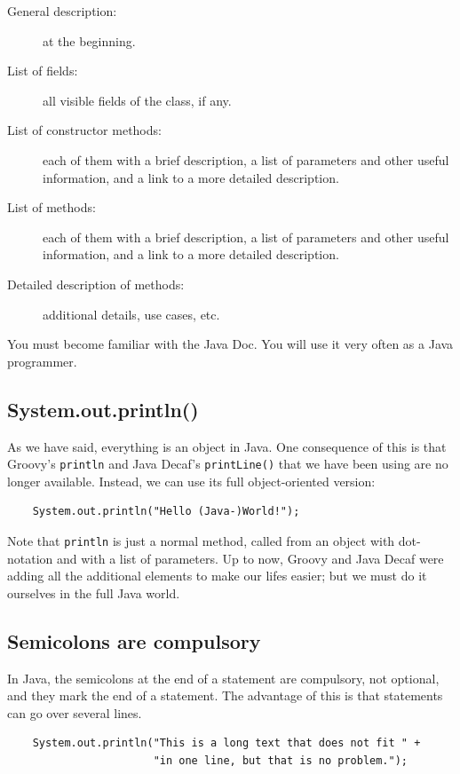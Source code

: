 \begin{description}
\item[General description:] at the beginning.
\item[List of fields:] all visible fields of the class, if any.
\item[List of constructor methods:] each of them with a brief
  description, a list of parameters and other useful information, and
  a link to a more detailed description.
\item[List of methods:] each of them with a brief
  description, a list of parameters and other useful information, and
  a link to a more detailed description.
\item[Detailed description of methods:] additional details, use cases,
  etc. 
\end{description}

You must become familiar with the Java Doc. You will use it very often
as a Java programmer. 

\subsection{System.out.println()}
\label{sec:system.out.println}

As we have said, everything is an object in Java. One consequence of
this is
that Groovy's \verb+println+ and Java Decaf's \verb+printLine()+
that we have been using are no 
longer available. Instead, we can use its full object-oriented
version: 

\begin{verbatim}
    System.out.println("Hello (Java-)World!");
\end{verbatim}

Note that \verb+println+ is just a normal method, called from an
object with dot-notation and with a list of parameters.
Up to now, Groovy and Java Decaf were adding all the additional elements to make our
lifes easier; but we must do it ourselves in the full Java world. 

\subsection{Semicolons are compulsory}
\label{sec:semic-are-comp}

In Java, the semicolons at the end of a statement are compulsory, not
optional, and they mark the end of a statement. 
The advantage of this is that statements can go over several lines. 

\begin{verbatim}
    System.out.println("This is a long text that does not fit " + 
                       "in one line, but that is no problem.");
\end{verbatim}

